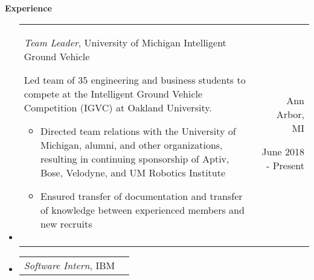 \documentclass[9pt]{memoir}
\begin{document}
\begin{mdframed}
\textbf{Experience}
\end{mdframed}

\begin{itemize}

\item

\begin{tabular}[t]{lr}

\begin{minipage}[t]{0.7 \textwidth}
\raggedright

\normalsize
\textit{Team Leader}, University of Michigan Intelligent Ground Vehicle

\small

Led team of 35 engineering and business students to compete at the Intelligent Ground Vehicle
Competition (IGVC) at Oakland University.

\begin{itemize}
\item Directed team relations with the University of Michigan, alumni, and other organizations,
      resulting in continuing sponsorship of Aptiv, Bose, Velodyne, and UM Robotics Institute
\item Ensured transfer of documentation and transfer of knowledge between experienced members and
      new recruits
\end{itemize}

\end{minipage}

&

\begin{minipage}[t]{0.2 \textwidth}
\raggedleft

\normalsize
Ann Arbor, MI

\small
June 2018 - Present
\end{minipage}

\\ \\

\end{tabular}

\item

\begin{tabular}[t]{lr}

\begin{minipage}[t]{0.7 \textwidth}
\raggedright

\normalsize
\textit{Software Intern}, IBM

\small


\end{minipage}
\end{tabular}
\end{itemize}
\end{document}
